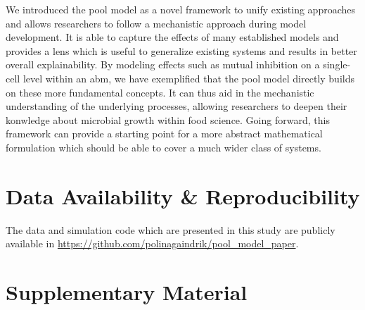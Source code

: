 \documentclass[10pt,twocolumn,5p]{elsarticle}
\numberwithin{equation}{section}
\newcommand{\beginsupplement}{%
  \renewcommand{\thesection}{}
  \setcounter{subsection}{0}
  \renewcommand{\thesubsection}{S\arabic{subsection}}
  \setcounter{table}{0}
  \renewcommand{\thetable}{S\arabic{table}}%
  \setcounter{figure}{0}
  \renewcommand{\thefigure}{S\arabic{figure}}%
  \setcounter{listing}{0}
  \renewcommand{\thelisting}{S\arabic{listing}}
}
\begin{document}
We introduced the pool model as a novel framework to unify existing approaches and allows researchers to follow a mechanistic approach during model development.
It is able to capture the effects of many established models and provides a lens which is useful to generalize existing systems and results in better overall explainability.
By modeling effects such as mutual inhibition on a single-cell level within an \ac{abm}, we have exemplified that the pool model directly builds on these more fundamental concepts.
It can thus aid in the mechanistic understanding of the underlying processes, allowing researchers to deepen their konwledge about microbial growth within food science.
Going forward, this framework can provide a starting point for a more abstract mathematical formulation which should be able to cover a much wider class of systems.

\onecolumn

\newpage
\section*{Data Availability \& Reproducibility}

The data and simulation code which are presented in this study are publicly available in
\url{https://github.com/polinagaindrik/pool_model_paper}.



\newpage
\beginsupplement
\section{Supplementary Material}
\end{document}

